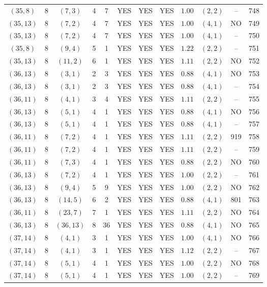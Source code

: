 \begin{longtable}{|c|c|c|c|c|c|c|c|c|c|c|c|}
$(35,8)$ & 8 & $(7,3)$ & 4 & 7 & YES & YES & YES & $1.00$ & $(2,2)$ & -- & 748\\
$(35,13)$ & 8 & $(7,2)$ & 4 & 7 & YES & YES & YES & $1.00$ & $(4,1)$ & NO & 749\\
$(35,13)$ & 8 & $(7,2)$ & 4 & 7 & YES & YES & YES & $1.00$ & $(4,1)$ & -- & 750\\
$(35,8)$ & 8 & $(9,4)$ & 5 & 1 & YES & YES & YES & $1.22$ & $(2,2)$ & -- & 751\\
$(35,13)$ & 8 & $(11,2)$ & 6 & 1 & YES & YES & YES & $1.11$ & $(2,2)$ & NO & 752\\
$(36,13)$ & 8 & $(3,1)$ & 2 & 3 & YES & YES & YES & $0.88$ & $(4,1)$ & NO & 753\\
$(36,13)$ & 8 & $(3,1)$ & 2 & 3 & YES & YES & YES & $0.88$ & $(4,1)$ & -- & 754\\
$(36,11)$ & 8 & $(4,1)$ & 3 & 4 & YES & YES & YES & $1.11$ & $(2,2)$ & -- & 755\\
$(36,13)$ & 8 & $(5,1)$ & 4 & 1 & YES & YES & YES & $0.88$ & $(4,1)$ & NO & 756\\
$(36,13)$ & 8 & $(5,1)$ & 4 & 1 & YES & YES & YES & $0.88$ & $(4,1)$ & -- & 757\\
$(36,11)$ & 8 & $(7,2)$ & 4 & 1 & YES & YES & YES & $1.11$ & $(2,2)$ & 919 & 758\\
$(36,11)$ & 8 & $(7,2)$ & 4 & 1 & YES & YES & YES & $1.11$ & $(2,2)$ & -- & 759\\
$(36,11)$ & 8 & $(7,3)$ & 4 & 1 & YES & YES & YES & $0.88$ & $(2,2)$ & NO & 760\\
$(36,13)$ & 8 & $(7,2)$ & 4 & 1 & YES & YES & YES & $1.00$ & $(2,2)$ & -- & 761\\
$(36,13)$ & 8 & $(9,4)$ & 5 & 9 & YES & YES & YES & $1.00$ & $(2,2)$ & NO & 762\\
$(36,13)$ & 8 & $(14,5)$ & 6 & 2 & YES & YES & YES & $0.88$ & $(4,1)$ & 801 & 763\\
$(36,11)$ & 8 & $(23,7)$ & 7 & 1 & YES & YES & YES & $1.11$ & $(2,2)$ & NO & 764\\
$(36,13)$ & 8 & $(36,13)$ & 8 & 36 & YES & YES & YES & $0.88$ & $(4,1)$ & NO & 765\\
$(37,14)$ & 8 & $(4,1)$ & 3 & 1 & YES & YES & YES & $1.00$ & $(4,1)$ & NO & 766\\
$(37,14)$ & 8 & $(4,1)$ & 3 & 1 & YES & YES & YES & $1.12$ & $(2,2)$ & -- & 767\\
$(37,14)$ & 8 & $(5,1)$ & 4 & 1 & YES & YES & YES & $1.00$ & $(2,2)$ & NO & 768\\
$(37,14)$ & 8 & $(5,1)$ & 4 & 1 & YES & YES & YES & $1.00$ & $(2,2)$ & -- & 769\\

\end{longtable}

